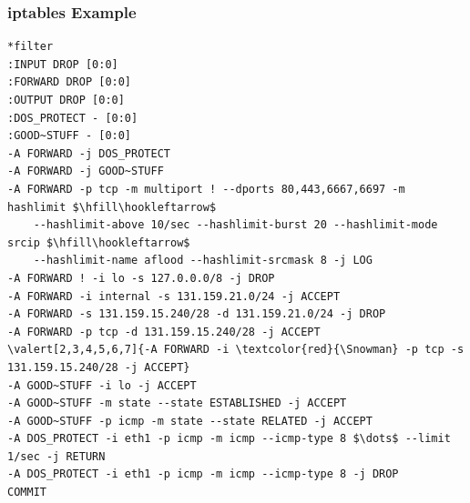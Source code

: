 \documentclass[aspectratio=169]{beamer}
\begin{document}
\newcommand{\valert}[2][]{%
  \if\relax\detokenize{#1}\relax%
    {#2}%
  \else
    \highlight<#1>{#2}%
  \fi}

\begin{frame}[fragile]
	\frametitle{iptables Example}
	
\begin{minipage}{\linewidth}
\footnotesize
\begin{Verbatim}[commandchars=\\\{\},codes={\catcode`$=3\catcode`^=7}]
*filter
:INPUT DROP [0:0]
:FORWARD DROP [0:0]
:OUTPUT DROP [0:0]
:DOS_PROTECT - [0:0]
:GOOD~STUFF - [0:0]
-A FORWARD -j DOS_PROTECT
-A FORWARD -j GOOD~STUFF
-A FORWARD -p tcp -m multiport ! --dports 80,443,6667,6697 -m hashlimit $\hfill\hookleftarrow$
    --hashlimit-above 10/sec --hashlimit-burst 20 --hashlimit-mode srcip $\hfill\hookleftarrow$
    --hashlimit-name aflood --hashlimit-srcmask 8 -j LOG
-A FORWARD ! -i lo -s 127.0.0.0/8 -j DROP
-A FORWARD -i internal -s 131.159.21.0/24 -j ACCEPT
-A FORWARD -s 131.159.15.240/28 -d 131.159.21.0/24 -j DROP
-A FORWARD -p tcp -d 131.159.15.240/28 -j ACCEPT
\valert[2,3,4,5,6,7]{-A FORWARD -i \textcolor{red}{\Snowman} -p tcp -s 131.159.15.240/28 -j ACCEPT}
-A GOOD~STUFF -i lo -j ACCEPT
-A GOOD~STUFF -m state --state ESTABLISHED -j ACCEPT
-A GOOD~STUFF -p icmp -m state --state RELATED -j ACCEPT
-A DOS_PROTECT -i eth1 -p icmp -m icmp --icmp-type 8 $\dots$ --limit 1/sec -j RETURN
-A DOS_PROTECT -i eth1 -p icmp -m icmp --icmp-type 8 -j DROP
COMMIT
\end{Verbatim}
\end{minipage}%

\end{frame}
\end{document}
